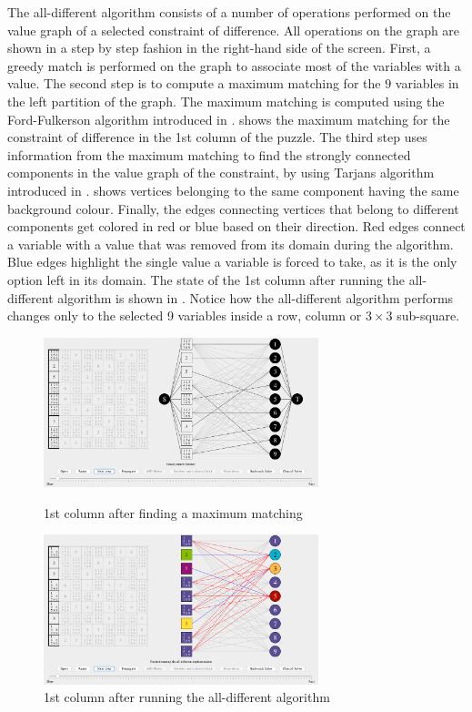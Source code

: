 \documentclass{l4proj}
\begin{document}
\noindent The all-different algorithm consists of a number of operations performed on the value graph of a selected constraint of difference. All operations on the graph are shown in a step by step fashion in the right-hand side of the screen. First, a greedy match is performed on the graph to associate most of the variables with a value. The second step is to compute a maximum matching for the $9$ variables in the left partition of the graph. The maximum matching is computed using the Ford-Fulkerson algorithm  \cite{ford1956maximal} introduced in .  shows the maximum matching for the constraint of difference in the 1st column of the puzzle. The third step uses information from the maximum matching to find the strongly connected components in the value graph of the constraint, by using Tarjan\textquotesingle s algorithm \cite{tarjan1972depth} introduced in .  shows vertices belonging to the same component having the same background colour. Finally, the edges connecting vertices that belong to different components get colored in red or blue based on their direction. Red edges connect a variable with a value that was removed from its domain during the algorithm. Blue edges highlight the single value a variable is forced to take, as it is the only option left in its domain. The state of the 1st column after running the all-different algorithm is shown in . Notice how the all-different algorithm performs changes only to the selected 9 variables inside a row, column or $3\times 3$ sub-square.

\begin{figure}[H]
\begin{minipage}{8.0cm}
\centering
\includegraphics[width=8cm]{images/proof_of_concept/screenshot1.png}
\caption{1st column after finding a maximum matching}
\label{screenshot1}
\end{minipage}%
\hfill
\begin{minipage}{8.0cm}
\centering
\includegraphics[width=8cm]{images/proof_of_concept/screenshot2.png}
\caption{1st column after running the all-different algorithm}
\label{screenshot2}
\end{minipage}%
\end{figure}
\end{document}
